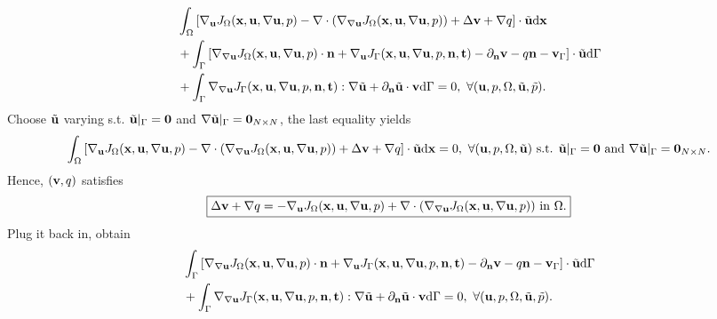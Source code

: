 \documentclass[oneside]{book}
\numberwithin{equation}{section}
\begin{document}
\begin{itemize}
\begin{itemize}
        \begin{align*}
            &\int_\Omega \left[\nabla_{\bf u}J_\Omega({\bf x},{\bf u},\nabla{\bf u},p) - \nabla\cdot(\nabla_{\nabla{\bf u}}J_\Omega({\bf x},{\bf u},\nabla{\bf u},p)) + \Delta{\bf v} + \nabla q\right]\cdot\tilde{\bf u}{\rm d}{\bf x}\nonumber\\
            &+ \int_\Gamma \left[\nabla_{\nabla{\bf u}}J_\Omega({\bf x},{\bf u},\nabla{\bf u},p)\cdot{\bf n} + \nabla_{\bf u}J_\Gamma({\bf x},{\bf u},\nabla{\bf u},p,{\bf n},{\bf t}) - \partial_{\bf n}{\bf v} - q{\bf n} - {\bf v}_\Gamma\right]\cdot\tilde{\bf u}{\rm d}\Gamma\nonumber\\
            &+ \int_\Gamma \nabla_{\nabla{\bf u}}J_\Gamma({\bf x},{\bf u},\nabla{\bf u},p,{\bf n},{\bf t}):\nabla\tilde{\bf u} + \partial_{\bf n}\tilde{\bf u}\cdot{\bf v}{\rm d}\Gamma = 0,\ \forall({\bf u},p,\Omega,\tilde{\bf u},\tilde{p}).
        \end{align*}
        Choose $\tilde{\bf u}$ varying s.t. $\tilde{\bf u}|_\Gamma = {\bf 0}$ and $\nabla\tilde{\bf u}|_\Gamma = {\bf 0}_{N\times N}$, the last equality yields
        \begin{align*}
            \int_\Omega \left[\nabla_{\bf u}J_\Omega({\bf x},{\bf u},\nabla{\bf u},p) - \nabla\cdot(\nabla_{\nabla{\bf u}}J_\Omega({\bf x},{\bf u},\nabla{\bf u},p)) + \Delta{\bf v} + \nabla q\right]\cdot\tilde{\bf u}{\rm d}{\bf x} = 0,\ \forall({\bf u},p,\Omega,\tilde{\bf u}) \mbox{ s.t. } \tilde{\bf u}|_\Gamma = {\bf 0} \mbox{ and } \nabla\tilde{\bf u}|_\Gamma = {\bf 0}_{N\times N}.
        \end{align*}
        Hence, $({\bf v},q)$ satisfies
        \begin{align*}
            \boxed{\Delta{\bf v} + \nabla q = -\nabla_{\bf u}J_\Omega({\bf x},{\bf u},\nabla{\bf u},p) + \nabla\cdot(\nabla_{\nabla{\bf u}}J_\Omega({\bf x},{\bf u},\nabla{\bf u},p)) \mbox{ in } \Omega.}
        \end{align*}
        Plug it back in, obtain
        \begin{align*}
            &\int_\Gamma \left[\nabla_{\nabla{\bf u}}J_\Omega({\bf x},{\bf u},\nabla{\bf u},p)\cdot{\bf n} + \nabla_{\bf u}J_\Gamma({\bf x},{\bf u},\nabla{\bf u},p,{\bf n},{\bf t}) - \partial_{\bf n}{\bf v} - q{\bf n} - {\bf v}_\Gamma\right]\cdot\tilde{\bf u}{\rm d}\Gamma\nonumber\\
            &+ \int_\Gamma \nabla_{\nabla{\bf u}}J_\Gamma({\bf x},{\bf u},\nabla{\bf u},p,{\bf n},{\bf t}):\nabla\tilde{\bf u} + \partial_{\bf n}\tilde{\bf u}\cdot{\bf v}{\rm d}\Gamma = 0,\ \forall({\bf u},p,\Omega,\tilde{\bf u},\tilde{p}).

\end{align*}
\end{itemize}
\end{itemize}
\end{document}
